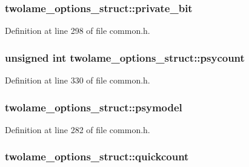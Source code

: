 \subsubsection[{\texorpdfstring{private\+\_\+bit}{private_bit}}]{ twolame\+\_\+options\+\_\+struct\+::private\+\_\+bit}\hypertarget{structtwolame__options__struct_ad783ce3ba698d20dca87fd42550c38ef}{}\label{structtwolame__options__struct_ad783ce3ba698d20dca87fd42550c38ef}


Definition at line 298 of file common.\+h.

\subsubsection[{\texorpdfstring{psycount}{psycount}}]{\setlength{\rightskip}{0pt plus 5cm}unsigned {\bf int} twolame\+\_\+options\+\_\+struct\+::psycount}\hypertarget{structtwolame__options__struct_a7effec5229bce5662be57b47b6b212f8}{}\label{structtwolame__options__struct_a7effec5229bce5662be57b47b6b212f8}


Definition at line 330 of file common.\+h.

\subsubsection[{\texorpdfstring{psymodel}{psymodel}}]{ twolame\+\_\+options\+\_\+struct\+::psymodel}\hypertarget{structtwolame__options__struct_a3b4099e20d7d3727015bf580a12806cc}{}\label{structtwolame__options__struct_a3b4099e20d7d3727015bf580a12806cc}


Definition at line 282 of file common.\+h.

\subsubsection[{\texorpdfstring{quickcount}{quickcount}}]{ twolame\+\_\+options\+\_\+struct\+::quickcount}\hypertarget{structtwolame__options__struct_a39883ae20b9d53fdf154845a0ecd5920}{}\label{structtwolame__options__struct_a39883ae20b9d53fdf154845a0ecd5920}


